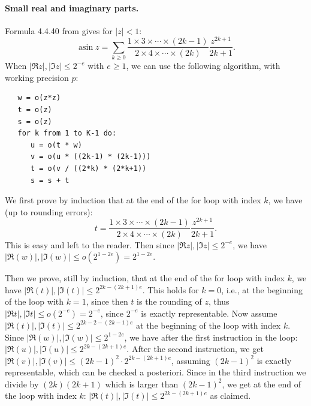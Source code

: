 \documentclass [11pt]{article}
\newcommand {\asin}{\operatorname {asin}}
\renewcommand {\leq}{\leqslant}
\renewcommand {\geq}{\geqslant}
\begin{document}
\paragraph{Small real and imaginary parts.}
Formula 4.4.40 from \cite{AbSt73} gives for $|z| < 1$:
\begin{equation} \label{eq_asin1}
  \asin z = \sum_{k \geq 0} \frac{1 \times 3 \times \cdots \times (2k-1)}
  {2 \times 4 \times \cdots \times (2k)} \frac{z^{2k+1}}{2k+1}.
\end{equation}
When $|\Re z|,|\Im z| \leq 2^{-e}$ with $e \geq 1$,
we can use the following algorithm, with working precision $p$:
\begin{verbatim}
   w = o(z*z)
   t = o(z)
   s = o(z)
   for k from 1 to K-1 do:
      u = o(t * w)
      v = o(u * ((2k-1) * (2k-1)))
      t = o(v / ((2*k) * (2*k+1))
      s = s + t
\end{verbatim}
We first prove by induction that at the end of the for loop with index $k$,
we have (up to rounding errors):
\[ t = \frac{1  \times 3 \times \cdots \times (2k-1)}
  {2 \times 4 \times \cdots \times (2k)} \frac{z^{2k+1}}{2k+1}. \]
This is easy and left to the reader.
Then since $|\Re z|,|\Im z| \leq 2^{-e}$,
we have $|\Re(w)|,|\Im(w)| \leq o(2^{1-2e}) = 2^{1-2e}$.

Then we prove, still by induction, that at the end of the for loop with index
$k$, we have $|\Re(t)|,|\Im(t)| \leq 2^{2k-(2k+1)e}$.
This holds for $k=0$, i.e., at the beginning of the loop with $k=1$,
since then $t$ is the rounding of $z$,
thus $|\Re t|,|\Im t| \leq o(2^{-e}) = 2^{-e}$,
since $2^{-e}$ is exactly representable.
Now assume $|\Re(t)|,|\Im(t)| \leq 2^{2k-2-(2k-1)e}$ at the beginning of the
loop with index $k$.
Since $|\Re(w)|,|\Im(w)| \leq 2^{1-2e}$, we have after the first instruction
in the loop: $|\Re(u)|, |\Im(u)| \leq 2^{2k-(2k+1)e}$. After the second
instruction, we get $|\Re(v)|, |\Im(v)| \leq (2k-1)^2 \cdot 2^{2k-(2k+1)e}$,
assuming $(2k-1)^2$ is exactly representable, which can be checked a
posteriori. Since in the third instruction we divide by $(2k)(2k+1)$
which is larger than $(2k-1)^2$, we get at the end of the loop with index $k$:
$|\Re(t)|, |\Im(t)| \leq 2^{2k-(2k+1)e}$ as claimed.
\end{document}
